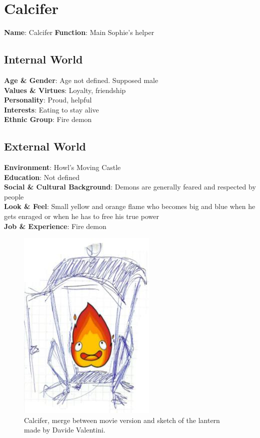 \section{Calcifer}

\begin{minipage}{0.5\textwidth}
\textbf{Name}: Calcifer
\textbf{Function}: Main Sophie's helper

\subsection{Internal World}

\textbf{Age \& Gender}: Age not defined. Supposed male \\
\textbf{Values \& Virtues}: Loyalty, friendship\\
\textbf{Personality}: Proud, helpful \\
\textbf{Interests}: Eating to stay alive\\
\textbf{Ethnic Group}: Fire demon

\subsection{External World}
\textbf{Environment}: Howl’s Moving Castle \\
\textbf{Education}: Not defined \\
\textbf{Social \& Cultural Background}: Demons are generally feared and respected by people \\
\textbf{Look \& Feel}: Small yellow and orange flame who becomes big and  blue when he gets enraged or when he has to free his true power\\
\textbf{Job \& Experience}: Fire demon \\

\end{minipage}%
%
\hfill\begin{minipage}{0.4\textwidth}
  \begin{figure}[H]
    \includegraphics{Images/Characters/lantern}
    \caption{Calcifer, merge between movie version and sketch of the lantern made by Davide Valentini.}
\end{figure}
\end{minipage}

